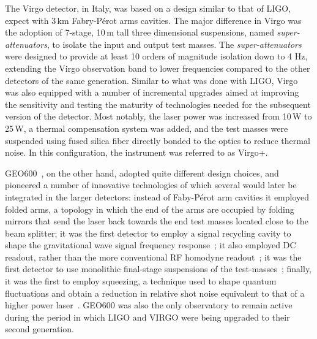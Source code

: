 The Virgo detector\cite{Accadia_2012}, in Italy, was based on a design similar to that of LIGO, expect with 3\,km Fabry-P\'{e}rot arms cavities. 
The major difference in Virgo was the adoption of 7-stage, 10\,m tall three dimensional suspensions, named \textit{super-attenuators}, to isolate the input and output test masses.
The \textit{super-attenuators} were designed to provide at least 10 orders of magnitude isolation down to 4 Hz, extending the Virgo observation band to lower frequencies compared to the other detectors of the same generation.
Similar to what was done with LIGO, Virgo was also equipped with a number of incremental upgrades aimed at improving the sensitivity and testing the maturity of technologies needed for the subsequent version of the detector.
Most notably, the laser power was increased from 10\,W to 25\,W, a thermal compensation system was added, and the test masses were suspended using fused silica fiber directly bonded to the optics to reduce thermal noise\cite{Lorenzini_2010}.
In this configuration, the instrument was referred to as Virgo+.

GEO600~\cite{Grote_2010}, on the other hand, adopted quite different design choices, and pioneered a number of innovative technologies of which several would later be integrated in the larger detectors:
instead of Faby-P\'{e}rot arm cavities it employed folded arms, a topology in which the end of the arms are occupied by folding mirrors that send the laser back towards the end test masses located close to the beam splitter;
it was the first detector to employ a signal recycling cavity to shape the gravitational wave signal frequency response~\cite{Willke_2002};
it also employed DC readout, rather than the more conventional RF homodyne readout~\cite{DCreadout};
it was the first detector to use monolithic final-stage suspensions of the test-masses~\cite{Plissi_2000};
finally, it was the first to employ squeezing, a technique used to shape quantum fluctuations and obtain a reduction in relative shot noise equivalent to that of a higher power laser~\cite{Grote_2013}.
GEO600 was also the only observatory to remain active during the period in which LIGO and VIRGO were being upgraded to their second generation.


